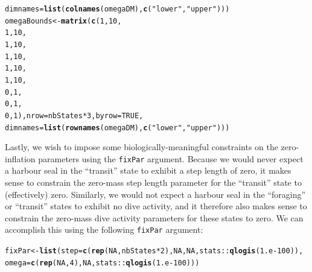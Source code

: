 \documentclass[12pt]{article}\usepackage[]{graphicx}\usepackage[]{xcolor}
\makeatletter
\newcommand{\hlnum}[1]{\textcolor[rgb]{0.686,0.059,0.569}{#1}}%
\newcommand{\hlsng}[1]{\textcolor[rgb]{0.192,0.494,0.8}{#1}}%
\newcommand{\hlopt}[1]{\textcolor[rgb]{0,0,0}{#1}}%
\newcommand{\hldef}[1]{\textcolor[rgb]{0.345,0.345,0.345}{#1}}%
\newcommand{\hlkwb}[1]{\textcolor[rgb]{0.69,0.353,0.396}{#1}}%
\newcommand{\hlkwc}[1]{\textcolor[rgb]{0.333,0.667,0.333}{#1}}%
\newcommand{\hlkwd}[1]{\textcolor[rgb]{0.737,0.353,0.396}{\textbf{#1}}}%
\newenvironment{kframe}{%
 \def\at@end@of@kframe{}%
 \ifinner\ifhmode%
  \def\at@end@of@kframe{\end{minipage}}%
  \begin{minipage}{\columnwidth}%
 \fi\fi%
 \def\FrameCommand##1{\hskip\@totalleftmargin \hskip-\fboxsep
 \colorbox{shadecolor}{##1}\hskip-\fboxsep
     \hskip-\linewidth \hskip-\@totalleftmargin \hskip\columnwidth}%
 \MakeFramed {\advance\hsize-\width
   \@totalleftmargin\z@ \linewidth\hsize
   \@setminipage}}%
 {\par\unskip\endMakeFramed%
 \at@end@of@kframe}
\newenvironment{knitrout}{}{} %
\makeatother
\begin{document}
\begin{knitrout}
\begin{kframe}
\begin{alltt}
                          \hlkwc{dimnames}\hldef{=}\hlkwd{list}\hldef{(}\hlkwd{colnames}\hldef{(omegaDM),}\hlkwd{c}\hldef{(}\hlsng{"lower"}\hldef{,}\hlsng{"upper"}\hldef{)))}
\hldef{omegaBounds} \hlkwb{<-} \hlkwd{matrix}\hldef{(}\hlkwd{c}\hldef{(}\hlnum{1}\hldef{,}\hlnum{10}\hldef{,}
                        \hlnum{1}\hldef{,}\hlnum{10}\hldef{,}
                        \hlnum{1}\hldef{,}\hlnum{10}\hldef{,}
                        \hlnum{1}\hldef{,}\hlnum{10}\hldef{,}
                        \hlnum{1}\hldef{,}\hlnum{10}\hldef{,}
                        \hlnum{1}\hldef{,}\hlnum{10}\hldef{,}
                        \hlnum{0}\hldef{,}\hlnum{1}\hldef{,}
                        \hlnum{0}\hldef{,}\hlnum{1}\hldef{,}
                        \hlnum{0}\hldef{,}\hlnum{1}\hldef{),}\hlkwc{nrow}\hldef{=nbStates}\hlopt{*}\hlnum{3}\hldef{,}\hlkwc{byrow}\hldef{=}\hlnum{TRUE}\hldef{,}
                      \hlkwc{dimnames}\hldef{=}\hlkwd{list}\hldef{(}\hlkwd{rownames}\hldef{(omegaDM),}\hlkwd{c}\hldef{(}\hlsng{"lower"}\hldef{,}\hlsng{"upper"}\hldef{)))}
\end{alltt}
\end{kframe}
\end{knitrout}
Lastly, we wish to impose some biologically-meaningful constraints on the zero-inflation parameters using the \verb|fixPar| argument. Because we would never expect a harbour seal in the ``transit'' state to exhibit a step length of zero, it makes sense to constrain the zero-mass step length parameter for the ``transit'' state to (effectively) zero.  Similarly, we would not expect a harbour seal in the ``foraging'' or ``transit'' states to exhibit no dive activity, and it therefore also makes sense to constrain the zero-mass dive activity parameters for these states to zero.  We can accomplish this using the following \verb|fixPar| argument:
\begin{knitrout}
\color{fgcolor}\begin{kframe}
\begin{alltt}
\hldef{fixPar} \hlkwb{<-} \hlkwd{list}\hldef{(}\hlkwc{step}\hldef{=}\hlkwd{c}\hldef{(}\hlkwd{rep}\hldef{(}\hlnum{NA}\hldef{,nbStates}\hlopt{*}\hlnum{2}\hldef{),}\hlnum{NA}\hldef{,}\hlnum{NA}\hldef{,stats}\hlopt{::}\hlkwd{qlogis}\hldef{(}\hlnum{1.e-100}\hldef{)),}
             \hlkwc{omega}\hldef{=}\hlkwd{c}\hldef{(}\hlkwd{rep}\hldef{(}\hlnum{NA}\hldef{,}\hlnum{4}\hldef{),}\hlnum{NA}\hldef{,stats}\hlopt{::}\hlkwd{qlogis}\hldef{(}\hlnum{1.e-100}\hldef{)))}
\end{alltt}
\end{kframe}
\end{knitrout}
\end{document}
